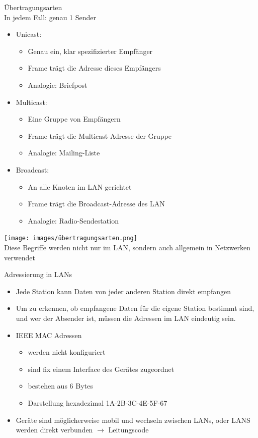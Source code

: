 \begin{definition}{Übertragungsarten}\\
    In jedem Fall: genau 1 Sender
    \begin{itemize}
        \item Unicast:
        \begin{itemize}
            \item Genau ein, klar spezifizierter Empfänger
            \item Frame trägt die Adresse dieses Empfängers
            \item Analogie: Briefpost
        \end{itemize}
        \item Multicast:
        \begin{itemize}
            \item Eine Gruppe von Empfängern
            \item Frame trägt die Multicast-Adresse der Gruppe
            \item Analogie: Mailing-Liste
        \end{itemize}
        \item Broadcast:
        \begin{itemize}
            \item An alle Knoten im LAN gerichtet
            \item Frame trägt die Broadcast-Adresse des LAN
            \item Analogie: Radio-Sendestation
        \end{itemize}
    \end{itemize}
        \texttt{[image: images/übertragungsarten.png]}\\
        Diese Begriffe werden nicht nur im LAN, sondern auch allgemein in Netzwerken verwendet
\end{definition}

\begin{concept}{Adressierung in LANs}
    \begin{itemize}
        \item Jede Station kann Daten von jeder anderen Station direkt empfangen
        \item Um zu erkennen, ob empfangene Daten für die eigene Station bestimmt sind, und wer der Absender ist, müssen die Adressen im LAN eindeutig sein.
        \item IEEE MAC Adressen
        \begin{itemize}
            \item werden nicht konfiguriert
            \item sind fix einem Interface des Gerätes zugeordnet
            \item bestehen aus 6 Bytes
            \item Darstellung hexadezimal 1A-2B-3C-4E-5F-67
        \end{itemize}
        \item Geräte sind möglicherweise mobil und wechseln zwischen LANs, oder LANS werden direkt verbunden $\longrightarrow$ Leitungscode
    \end{itemize}
\end{concept}

